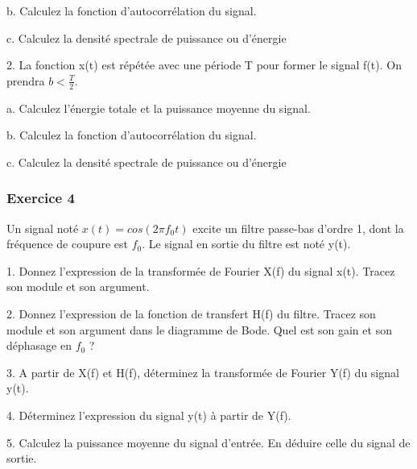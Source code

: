 	b. Calculez la fonction d'autocorrélation du signal.
	
	c. Calculez la densité spectrale de puissance ou d'énergie
	
	\vspace{0.5\baselineskip}
	
	2. La fonction x(t) est répétée avec une période T pour former le signal f(t). On prendra $b<\frac{T}{2}$.
	
	a. Calculez l'énergie totale et la puissance moyenne du signal.
	
	b. Calculez la fonction d'autocorrélation du signal.
	
	c. Calculez la densité spectrale de puissance ou d'énergie
	
	\vspace{1\baselineskip}
	
	\subsubsection{Exercice 4}
	
	Un signal noté $x(t)=cos(2\pi f_{0}t)$ excite un filtre passe-bas d'ordre 1, dont la fréquence de coupure est $f_{0}$. Le signal en sortie du filtre est noté y(t).
	
	\vspace{0.5\baselineskip}	
	
	1. Donnez l'expression de la transformée de Fourier X(f) du signal x(t). Tracez son module et son argument.
	
	\vspace{0.5\baselineskip}
	
	2. Donnez l'expression de la fonction de transfert H(f) du filtre. Tracez son module et son argument dans le diagramme de Bode. Quel est son gain et son déphasage en $f_{0}$ ?
	
	\vspace{0.5\baselineskip}
	
	3. A partir de X(f) et H(f), déterminez la transformée de Fourier Y(f) du signal y(t).
	
	\vspace{0.5\baselineskip}
	
	4. Déterminez l'expression du signal y(t) à partir de Y(f).
	
	\vspace{0.5\baselineskip}
	
	5. Calculez la puissance moyenne du signal d'entrée. En déduire celle du signal de sortie.
	
	\vspace{1\baselineskip}	
	
